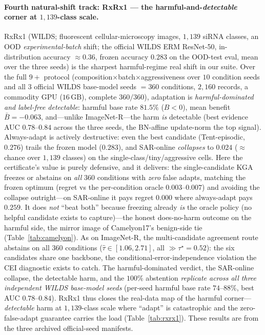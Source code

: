 \documentclass[conference]{IEEEtran}
\theoremstyle{plain}
\theoremstyle{definition}
\begin{document}
\paragraph{Fourth natural-shift track: RxRx1 --- the harmful-and-\emph{detectable} corner at $1{,}139$-class scale.}
RxRx1 (WILDS; fluorescent cellular-microscopy images, $1{,}139$ siRNA classes, an OOD
\emph{experimental-batch} shift; the official WILDS ERM ResNet-50, in-distribution accuracy
${\approx}0.36$, frozen accuracy $0.283$ on the OOD-test eval, mean over the three seeds) is the
sharpest harmful-regime real shift in our suite. Over the full $9{+}$ protocol
(composition$\times$batch$\times$aggressiveness over $10$ condition seeds and all $3$ official WILDS
base-model seeds $=360$ conditions, $2{,}160$ records, a commodity GPU ($16$\,GB), complete
$360/360$), adaptation is \emph{harmful-dominated and label-free detectable}: harmful base rate
$81.5\%$ ($B<0$), mean benefit $\bar B={-}0.063$, and---unlike ImageNet-R---the harm \emph{is}
detectable (best evidence AUC $0.78$--$0.84$ across the three seeds, the BN-affine update-norm the top
signal). Always-adapt is actively destructive: even the best candidate (Tent-episodic, $0.276$) trails
the frozen model ($0.283$), and SAR-online \emph{collapses} to $0.024$ ($\approx$ chance over
$1{,}139$ classes) on the single-class/tiny/aggressive cells. Here the certificate's value is purely
defensive, and it delivers: the single-candidate \textsc{KGA} freezes or abstains on \emph{all} $360$
conditions with \emph{zero} false adapts, matching the frozen optimum (regret vs the per-condition
oracle $0.003$--$0.007$) and avoiding the collapse outright---on SAR-online it pays regret $0.000$
where always-adapt pays $0.259$. It does \emph{not} ``beat both'' because freezing already \emph{is}
the oracle policy (no helpful candidate exists to capture)---the honest does-no-harm outcome on the
harmful side, the mirror image of Camelyon17's benign-side tie (Table~\ref{tab:camelyon}). As on
ImageNet-R, the multi-candidate agreement route abstains on all $360$ conditions
($\hat\tau\in[1.06,2.71]$, all $\gg\tau^\star{=}0.52$): the six candidates share one backbone, the
conditional-error-independence violation the CEI diagnostic exists to catch. The harmful-dominated
verdict, the SAR-online collapse, the detectable harm, and the $100\%$ abstention \emph{replicate
across all three independent WILDS base-model seeds} (per-seed harmful base rate $74$--$88\%$, best
AUC $0.78$--$0.84$). RxRx1 thus closes the real-data map of the harmful corner---\emph{detectable}
harm at $1{,}139$-class scale where ``adapt'' is catastrophic and the zero-false-adapt guarantee
carries the load (Table~\ref{tab:rxrx1}). These results are from the three archived
official-seed manifests.
\end{document}
